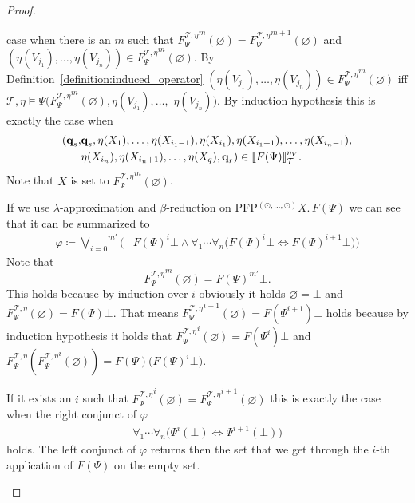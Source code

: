 \begin{proof}
\begin{compactitem}
        case when there is an $m$ such that ${F_\Psi^{\mathcal{T},\eta}}^m(\varnothing) = {F_\Psi^		
       {\mathcal{T},\eta}}^{m+1}(\varnothing)$ and $(\eta(V_{j_1}), \dots, \eta(V_{j_n})) \in {F_\Psi^{\mathcal{T},\eta}}^m(\varnothing)$. By Definition~\ref{definition:induced_operator} $(\eta(V_{j_1}), \dots, 		
        \eta(V_{j_n})) \in {F_\Psi^{\mathcal{T},\eta}}^m(\varnothing)$ iff $\mathcal{T}, \eta \models \Psi({F_\Psi^
       {\mathcal{T},\eta}}^{m}(\varnothing), \eta(V_{j_1}), \dots, $ $\eta(V_{j_n}))$. By induction hypothesis 
        this is exactly the case when 
\begin{align*}
        (\emph{q}_s, &\emph{q}_s, \eta(X_1), \dots, \eta(X_{i_1-1}), \eta(X_{i_1}), \eta(X_{i_1+1}), \dots, \eta(X_{i_n-1}), \\&\eta(X_{i_n}), \eta(X_{i_n+1}), \dots, \eta
            (X_q), \emph{q}_r) \in \llbracket
        F(\Psi) \rrbracket^{\eta_V}_\mathcal{T}.
        \end{align*}       
        Note that $X$ is set to ${F_\Psi^{\mathcal{T},\eta}}^{m}(\varnothing)$.
		         
         If we use $\lambda$-approximation and $\beta$-reduction on PFP$^{(\odot, \dots, \odot)} X.\,F(\Psi)$ we can 
         see that it can be summarized to
         \begin{align*}
         \varphi \coloneqq \overset{m'}{\underset{i=0}{\bigvee}} \Big(&F(\Psi)^i \bot \wedge \forall_1 \dotsb \forall_n
         \big(F(\Psi)^i \bot \Leftrightarrow F(\Psi)^{i+1} \bot \big)\Big)
         \end{align*}
		Note that 
		\[{F_\Psi^{\mathcal{T},\eta}}^m(\varnothing) = F(\Psi)^{m'} \bot.\] 
		This holds because by induction over $i$ obviously it holds
		$\varnothing = \bot$
		and 
		$F_\Psi^{\mathcal{T},\eta}(\varnothing) = F(\Psi) \bot.$
		That means 
		${F_\Psi^{\mathcal{T},\eta}}^{i+1}(\varnothing) = F(\Psi^{i+1}) \bot $
		holds because by induction hypothesis it holds that
		${F_\Psi^{\mathcal{T},\eta}}^{i}
		(\varnothing) = F(\Psi^{i}) \bot$
		and 
		$F_\Psi^{\mathcal{T},\eta}({F_\Psi^{\mathcal{T},\eta}}^{i}(\varnothing))= F(\Psi)\big(F(\Psi)^{i} \bot \big).$
		
		If it exists an $i$ such that ${F_\Psi^{\mathcal{T},\eta}}^i(\varnothing) = {F_\Psi^		
        {\mathcal{T},\eta}}^{i+1}(\varnothing)$ this is exactly the case when the right conjunct of $\varphi$
		\begin{align*}
		\forall_1 \dotsb \forall_n \big(\Psi^i(\bot) \Leftrightarrow \Psi^{i+1}(\bot)\big)
         \end{align*}
		holds. The left conjunct of $\varphi$ returns then the set that we get through  
		the $i$-th application of $F(\Psi)$ on the empty set.
		

\end{compactitem}
\end{proof}
